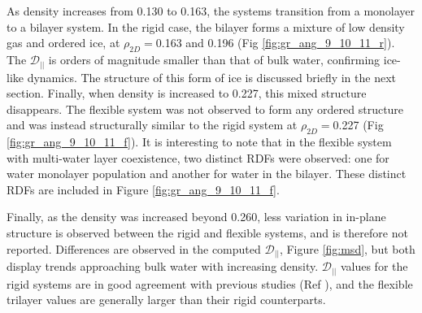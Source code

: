 \documentclass[12pt]{article}
\begin{document}
As density increases from 0.130 to 0.163, the systems transition from a monolayer to a bilayer system. In the rigid case, the bilayer forms a mixture of low density gas and ordered ice, at \(\rho_{2D}=\)0.163 and 0.196 (Fig \ref{fig:gr_ang_9_10_11_r}). The \(\mathcal{D}_{||}\) is orders of magnitude smaller than that of bulk water, confirming ice-like dynamics. The structure of this form of ice is discussed briefly in the next section. Finally, when density is increased to 0.227, this mixed structure disappears. The flexible system was not observed to form any ordered structure and was instead structurally similar to the rigid system at \(\rho_{2D}=\)0.227 (Fig \ref{fig:gr_ang_9_10_11_f}). It is interesting to note that in the flexible system with multi-water layer coexistence, two distinct RDFs were observed: one for water monolayer population and another for water in the bilayer. These distinct RDFs are included in Figure \ref{fig:gr_ang_9_10_11_f}.

Finally, as the density was increased beyond 0.260, less variation in in-plane structure is observed between the rigid and flexible systems, and is therefore not reported. Differences are observed in the computed \(\mathcal{D}_{||}\), Figure \ref{fig:msd}, but both display trends approaching bulk water with increasing density. \(\mathcal{D}_{||}\) values for the rigid systems are in good agreement with previous studies (Ref \cite{Mosaddeghi2012}), and the flexible trilayer values are generally larger than their rigid counterparts. 


\setlength{\fboxsep}{0.75pt}%
\setlength{\fboxrule}{1.2pt}%
\end{document}
